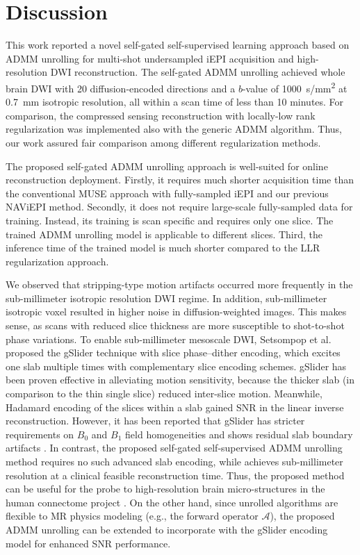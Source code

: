 \documentclass[journal,twoside,web]{ieeecolor}
\begin{document}
	\section{Discussion}

	This work reported a novel self-gated self-supervised learning approach 
	based on ADMM unrolling
	for multi-shot undersampled iEPI acquisition and high-resolution DWI reconstruction.
	The self-gated ADMM unrolling achieved whole brain DWI 
	with 20 diffusion-encoded directions and a $b$-value of \SI{1000}{s/mm^2}
	at \SI{0.7}{mm} isotropic resolution,
	all within a scan time of less than 10 minutes.
	For comparison, the compressed sensing reconstruction with 
	locally-low rank regularization was implemented also with the generic ADMM algorithm.
	Thus, our work assured fair comparison among different regularization methods.

	The proposed self-gated ADMM unrolling approach is well-suited 
	for online reconstruction deployment.
	Firstly, it requires much shorter acquisition time than
	the conventional MUSE approach with fully-sampled iEPI and
	our previous NAViEPI method.
	Secondly, it does not require large-scale fully-sampled data for training.
	Instead, its training is scan specific and requires only one slice.
	The trained ADMM unrolling model is applicable to different slices.
	Third, the inference time of the trained model is much
	shorter compared to the LLR regularization approach.

	We observed that stripping-type motion artifacts occurred more frequently
	in the sub-millimeter isotropic resolution DWI regime.
	In addition, sub-millimeter isotropic voxel 
	resulted in higher noise in diffusion-weighted images.
	This makes sense, as scans with reduced slice thickness are more susceptible to
	shot-to-shot phase variations.
	To enable sub-millimeter mesoscale DWI,
	Setsompop et al.~\cite{setsompop_2018_gslider}
	proposed the gSlider technique with slice phase–dither encoding,
	which excites one slab multiple times with complementary slice encoding schemes.
	gSlider has been proven effective in alleviating motion sensitivity,
	because the thicker slab (in comparison to the thin single slice)
	reduced inter-slice motion.
	Meanwhile, Hadamard encoding of the slices within a slab gained SNR
	in the linear inverse reconstruction.
	However, it has been reported that gSlider has stricter requirements
	on $B_0$ and $B_1$ field homogeneities 
	and shows residual slab boundary artifacts
	\cite{dai_2021_smslab}.
	In contrast, the proposed self-gated self-supervised ADMM unrolling method
	requires no such advanced slab encoding,
	while achieves sub-millimeter resolution
	at a clinical feasible reconstruction time.
	Thus, the proposed method can be useful for the probe to high-resolution
	brain micro-structures in the human connectome project \cite{huang_2021_hcp2}.
	On the other hand, since unrolled algorithms are flexible to 
	MR physics modeling (e.g., the forward operator $\mathcal{A}$), 
	the proposed ADMM unrolling can be extended 
	to incorporate with the gSlider encoding model for enhanced SNR performance.
\end{document}
